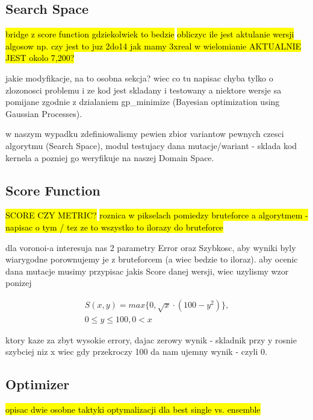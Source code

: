 \documentclass[format=acmsmall,screen,review,authordraft,nonacm]{acmart}
\begin{document}
\subsection{Search Space} %

\hl{bridge z score function gdziekolwiek to bedzie}
\hl{obliczyc ile jest aktulanie wersji algosow np. czy jest to juz 2do14 jak
mamy 3xreal w wielomianie AKTUALNIE JEST okolo 7,200?}

jakie modyfikacje, na to osobna sekcja? wiec co tu napisac
chyba tylko o zlozonosci problemu i ze kod jest skladany i testowany a niektore
wersje sa pomijane zgodnie z dzialaniem gp\_minimize (Bayesian optimization
using Gaussian Processes).

w naszym wypadku zdefiniowalismy pewien zbior variantow pewnych czesci
algorytmu (Search Space), modul testujacy dana mutacje/wariant - sklada kod kernela a pozniej go weryfikuje na naszej Domain Space.

\subsection{Score Function} %

\hl{SCORE CZY METRIC?}
\hl{roznica w pikselach pomiedzy bruteforce a algorytmem - napisac o tym / tez
ze to wszystko to ilorazy do bruteforce}

dla voronoi-a interesuja nas 2 parametry Error oraz Szybkosc, aby wyniki byly
wiarygodne porownujemy je z bruteforcem (a wiec bedzie to iloraz).
aby ocenic dana mutacje musimy przypisac jakis Score danej wersji, wiec uzylismy
wzor ponizej

\begin{align}
	S(x,y) = max\{0, \sqrt{x} \cdot (100-y^{2})\}, \\
0 \leq y \leq 100, 0 < x
\end{align}

ktory kaze za zbyt wysokie errory, dajac zerowy wynik - skladnik przy y rosnie
szybciej niz x wiec gdy przekroczy 100 da nam ujemny wynik - czyli 0.

\subsection{Optimizer} %

\hl{opisac dwie osobne taktyki optymalizacji dla best single vs. ensemble}
\end{document}
